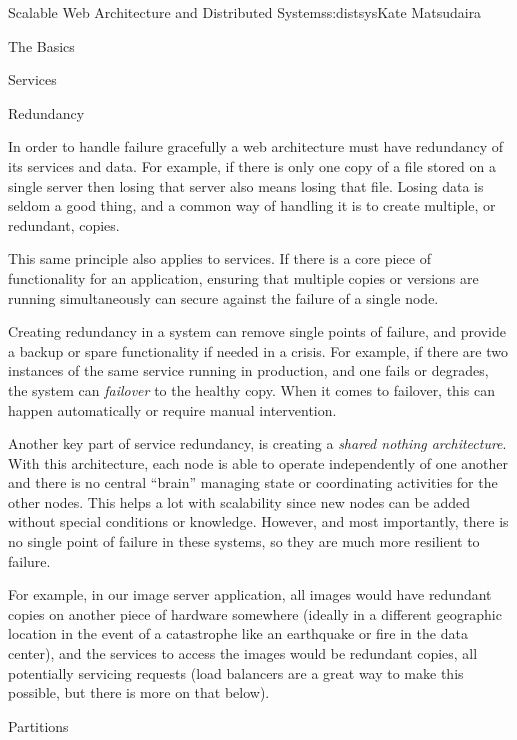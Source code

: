 \begin{aosachapter}{Scalable Web Architecture and Distributed Systems}{s:distsys}{Kate Matsudaira}
\begin{aosasect1}{The Basics}
\begin{aosasect2}{Services}
\end{aosasect2}

\begin{aosasect2}{Redundancy}

In order to handle failure gracefully a web architecture must have
redundancy of its services and data. For example, if there is only one
copy of a file stored on a single server then losing that server also
means losing that file. Losing data is seldom a good thing, and a
common way of handling it is to create multiple, or redundant, copies.

This same principle also applies to services. If there is a core piece
of functionality for an application, ensuring that multiple copies or
versions are running simultaneously can secure against the failure of
a single node.

Creating redundancy in a system can remove single points of failure,
and provide a backup or spare functionality if needed in a crisis. For
example, if there are two instances of the same service running in
production, and one fails or degrades, the system can \emph{failover}
to the healthy copy. When it comes to failover, this can happen
automatically or require manual intervention.

Another key part of service redundancy, is creating a \emph{shared
  nothing architecture}. With this architecture, each node is able to
operate independently of one another and there is no central ``brain''
managing state or coordinating activities for the other nodes. This
helps a lot with scalability since new nodes can be added without
special conditions or knowledge. However, and most importantly, there
is no single point of failure in these systems, so they are much more
resilient to failure.

For example, in our image server application, all images would have
redundant copies on another piece of hardware somewhere (ideally in a
different geographic location in the event of a catastrophe like an
earthquake or fire in the data center), and the services to access the
images would be redundant copies, all potentially servicing requests
(load balancers are a great way to make this possible, but there is
more on that below).


\end{aosasect2}

\begin{aosasect2}{Partitions}


\end{aosasect2}
\end{aosasect1}
\end{aosachapter}
